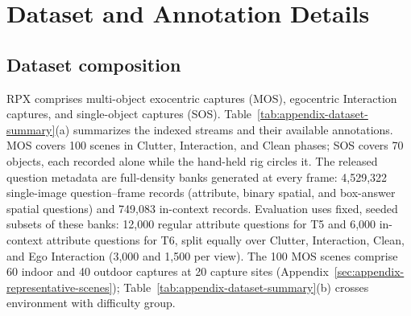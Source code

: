 \newcommand\catrow[4]{\noindent\parbox[c]{\catL}{\raggedleft\small\textbf{Scene #1}\\[1pt]\footnotesize #2\\\textcolor{#3}{#4}}\hspace{0.2cm}%
  \catcell{#1}{0}\hspace{\catG}\catcell{#1}{1}\hspace{\catG}\catcell{#1}{2}\hspace{\catG}\catcell{#1}{ego}\par\vspace{\catRowSep}}
\newlength\catRowSep\setlength\catRowSep{\catG}
\makeatletter\newcommand\rawneed[1]{\par\begingroup\dimen@=#1\relax\dimen@ii=\pagegoal\advance\dimen@ii-\pagetotal
  \ifdim\dimen@>\dimen@ii\ifdim\dimen@ii>\z@\vfil\fi\penalty-10000\fi\endgroup}\makeatother
\def\rawsep{\arrayrulecolor{rpxHair}\specialrule{.25pt}{1.4pt}{1.4pt}\arrayrulecolor{black}}

\section{Dataset and Annotation Details}
\label{sec:appendix-dataset}

\subsection{Dataset composition}

RPX comprises multi-object exocentric captures (MOS), egocentric Interaction captures, and single-object captures (SOS). Table~\ref{tab:appendix-dataset-summary}(a) summarizes the indexed streams and their available annotations. MOS covers 100 scenes in Clutter, Interaction, and Clean phases; SOS covers 70 objects, each recorded alone while the hand-held rig circles it. The released question metadata are full-density banks generated at every frame: 4,529,322 single-image question--frame records (attribute, binary spatial, and box-answer spatial questions) and 749,083 in-context records. Evaluation uses fixed, seeded subsets of these banks: 12,000 regular attribute questions for T5 and 6,000 in-context attribute questions for T6, split equally over Clutter, Interaction, Clean, and Ego Interaction (3,000 and 1,500 per view). The 100 MOS scenes comprise 60 indoor and 40 outdoor captures at 20 capture sites (Appendix~\ref{sec:appendix-representative-scenes}); Table~\ref{tab:appendix-dataset-summary}(b) crosses environment with difficulty group.


